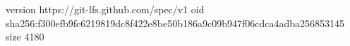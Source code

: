 version https://git-lfs.github.com/spec/v1
oid sha256:f300efb9fc6219819dc8f422e8be50b186a9c09b947f06cdca4adba256853145
size 4180
